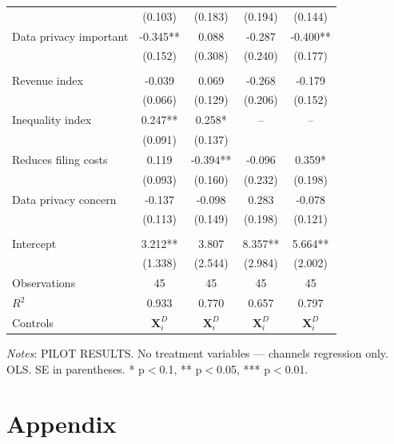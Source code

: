 \documentclass[11pt]{article}
\begin{document}
\begin{table}[!htbp]
\begin{threeparttable}
\begin{tabular}{l|cccc}
 & (0.103) & (0.183) & (0.194) & (0.144) \\
Data privacy important & -0.345** & 0.088 & -0.287 & -0.400** \\
 & (0.152) & (0.308) & (0.240) & (0.177) \\
\\[0.5em]
Revenue index & -0.039 & 0.069 & -0.268 & -0.179 \\
 & (0.066) & (0.129) & (0.206) & (0.152) \\
Inequality index & 0.247** & 0.258* & -- & -- \\
 & (0.091) & (0.137) &  &  \\
Reduces filing costs & 0.119 & -0.394** & -0.096 & 0.359* \\
 & (0.093) & (0.160) & (0.232) & (0.198) \\
Data privacy concern & -0.137 & -0.098 & 0.283 & -0.078 \\
 & (0.113) & (0.149) & (0.198) & (0.121) \\
\\[0.5em]
Intercept & 3.212** & 3.807 & 8.357** & 5.664** \\
 & (1.338) & (2.544) & (2.984) & (2.002) \\
\midrule
Observations & 45 & 45 & 45 & 45 \\
$R^2$ & 0.933 & 0.770 & 0.657 & 0.797 \\
Controls & $\mathbf{X}_{i}^{D}$ & $\mathbf{X}_{i}^{D}$ & $\mathbf{X}_{i}^{D}$ & $\mathbf{X}_{i}^{D}$ \\
\bottomrule
\end{tabular}
\begin{tablenotes}[flushleft]
\footnotesize
\item \textit{Notes}: PILOT RESULTS. No treatment variables --- channels regression only. OLS. SE in parentheses. * p$<$0.1, ** p$<$0.05, *** p$<$0.01.
\end{tablenotes}
\end{threeparttable}
\end{table}

\FloatBarrier
\section{Appendix}
\end{document}
